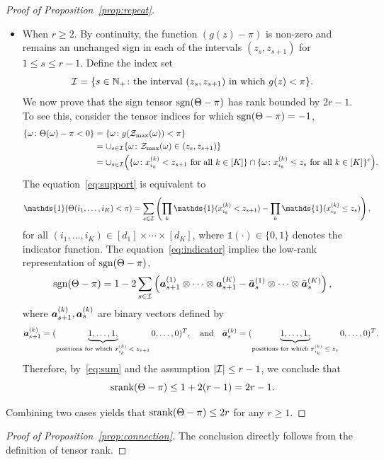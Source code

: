 \documentclass[twoside,11pt]{article}
\theoremstyle{definition}
\newcommand*{\KeepStyleUnderBrace}[1]{%
  \mathop{%
    \mathchoice
    {\underbrace{\displaystyle#1}}%
    {\underbrace{\textstyle#1}}%
    {\underbrace{\scriptstyle#1}}%
    {\underbrace{\scriptscriptstyle#1}}%
  }\limits
}
\def\sign{\textup{sgn}}
\def\srank{\textup{srank}}
\begin{document}
\begin{proof}[Proof of Proposition~\ref{prop:repeat}]
\begin{itemize}[leftmargin=*,topsep=0pt,itemsep=-1ex,partopsep=1ex,parsep=1ex]
\item When $r\geq 2$.   By continuity, the function $(g(z)-\pi)$ is non-zero and remains an unchanged sign in each of the intervals $(z_s, z_{s+1})$ for $1\leq s\leq r-1$. Define the index set 
\[
\mathcal{I}=\{s\in\mathbb{N}_{+}\colon \text{the interval $(z_s, z_{s+1})$ in which $g(z)<\pi$}\}.
\] 
We now prove that the sign tensor $\sign(\Theta-\pi)$ has rank bounded by $2r-1$. To see this, consider the tensor indices for which $\sign(\Theta-\pi)=-1$,
\begin{align}\label{eq:support}
\{\omega\colon \Theta(\omega)-\pi <0 \} & = \{\omega \colon g(\mathcal{Z}_{\max}(\omega))<\pi\} \notag \\
&=\cup_{s\in \mathcal{I}} \{\omega\colon \mathcal{Z}_{\max}(\omega)\in(z_s,z_{s+1})\}\notag\\
&=\cup_{s\in \mathcal{I}}\Big( \{\omega\colon \text{$x^{(k)}_{i_k}< z_{s+1}$ for all $k\in[K]$}\}\cap \{\omega\colon \text{$x^{(k)}_{i_k}\leq z_{s}$ for all $k\in[K]$}\}^c\Big).
\end{align}
The equation~\eqref{eq:support} is equivalent to 
\begin{align}\label{eq:indicator}
\mathds{1}(\Theta(i_1,\ldots,i_K)< \pi)&
=\sum_{s\in \tI}\left( \prod_k \mathds{1}(x^{(k)}_{i_k}< z_{s+1}) - \prod_k \mathds{1}(x^{(k)}_{i_k}\leq z_{s})\right),
\end{align}
for all $(i_1,\ldots,i_K)\in[d_1]\times \cdots\times[d_K]$, where $\mathds{1}(\cdot)\in\{0,1\}$ denotes the indicator function. The equation~\eqref{eq:indicator} implies the low-rank representation of $\sign(\Theta-\pi)$,
\begin{equation}\label{eq:sum}
\sign(\Theta-\pi)=1-2\sum_{s\in \tI } \left(\ma^{(1)}_{s+1}\otimes\cdots\otimes \ma^{(K)}_{s+1} - \bar \ma^{(1)}_s\otimes\cdots\otimes \bar \ma^{(K)}_s\right),
\end{equation}
where $\bm{a}^{(k)}_{s+1}, \bm{a}^{(k)}_{s}$ are binary vectors defined by
\[
\ma^{(k)}_{s+1}=(\KeepStyleUnderBrace{1,\ldots,1,}_{\text{positions for which $x_{i_k}^{(k)}<z_{s+1}$}}0,\ldots, 0)^T,\quad \text{and}\quad
\bar \ma^{(k)}_s=(\KeepStyleUnderBrace{1,\ldots,1,}_{\text{positions for which $x_{i_k}^{(k)}\leq z_{s}$}}0,\ldots, 0)^T.
\]
Therefore, by~\eqref{eq:sum} and the assumption $|\mathcal{I}|\leq r-1$, we conclude that 
\[
\srank(\Theta-\pi)\leq 1+2(r-1)=2r-1.
\]
\end{itemize}
Combining two cases yields that $\srank(\Theta-\pi)\leq 2r$ for any $r\geq 1$.
\end{proof}


\begin{proof}[Proof of Proposition~\ref{prop:connection}]
The conclusion directly follows from the definition of tensor rank. 
\end{proof}
\end{document}
